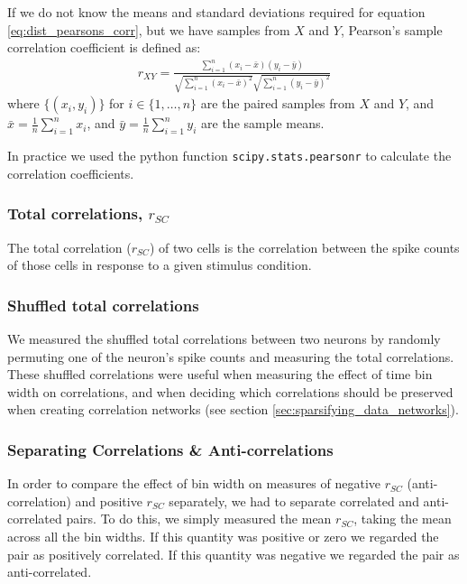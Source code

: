     If we do not know the means and standard deviations required for equation \ref{eq:dist_pearsons_corr}, but we have samples from $X$ and $Y$, Pearson's sample correlation coefficient is defined as:
    \begin{align}
        r_{XY} = \frac{\sum_{i=1}^n (x_i - \bar{x})(y_i - \bar{y})}{\sqrt{\sum_{i=1}^n (x_i - \bar{x})^2}\sqrt{\sum_{i=1}^n (y_i - \bar{y})^2}}
    \end{align}
    where $\lbrace (x_i, y_i) \rbrace$ for $i \in \lbrace 1, \dots, n \rbrace$ are the paired samples from $X$ and $Y$, and $\bar{x} = \frac{1}{n}\sum_{i=1}^n x_i$, and $\bar{y} = \frac{1}{n}\sum_{i=1}^n y_i$ are the sample means.

    In practice we used the python function \texttt{scipy.stats.pearsonr} to calculate the correlation coefficients.

        \subsubsection{Total correlations, $r_{SC}$}\label{sec:spike_count_correlation}
        The total correlation ($r_{SC}$) of two cells is the correlation between the spike counts of those cells in response to a given stimulus condition.

        \subsubsection{Shuffled total correlations}\label{sec:shuffled_correlations}
        We measured the shuffled total correlations between two neurons by randomly permuting one of the neuron's spike counts and measuring the total correlations. These shuffled correlations were useful when measuring the effect of time bin width on correlations, and when deciding which correlations should be preserved when creating correlation networks (see section \ref{sec:sparsifying_data_networks}).

        \subsubsection{Separating Correlations \& Anti-correlations}\label{sec:corr_anti_corr}
        In order to compare the effect of bin width on measures of negative $r_{SC}$ (anti-correlation) and positive $r_{SC}$ separately, we had to separate correlated and anti-correlated pairs. To do this, we simply measured the mean $r_{SC}$, taking the mean across all the bin widths. If this quantity was positive or zero we regarded the pair as positively correlated. If this quantity was negative we regarded the pair as anti-correlated.

